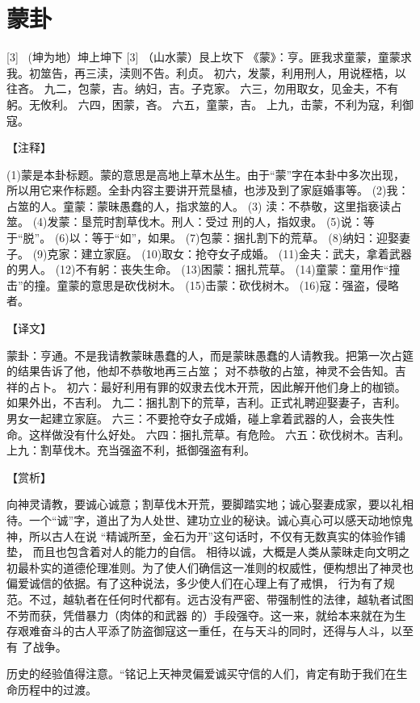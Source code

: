 \documentclass[12pt,UTF8]{ctexbook}
\begin{document}
\chapter{蒙卦}
[3] \ (坤为地）坤上坤下
[3]
（山水蒙）艮上坎下
《蒙》：亨。匪我求童蒙，童蒙求我。初筮告，再三渎，渎则不告。利贞。
初六，发蒙，利用刑人，用说桎梏，以往吝。
九二，包蒙，吉。纳妇，吉。子克家。
六三，勿用取女，见金夫，不有躬。无攸利。
六四，困蒙，吝。
六五，童蒙，吉。
上九，击蒙，不利为寇，利御寇。

【注释】

(1)蒙是本卦标题。蒙的意思是高地上草木丛生。由于“蒙”字在本卦中多次出现，所以用它来作标题。全卦内容主要讲开荒垦植，也涉及到了家庭婚事等。
(2)我：占筮的人。童蒙：蒙昧愚蠢的人，指求筮的人。
(3) 渎：不恭敬，这里指亵读占筮。
(4)发蒙：垦荒时割草伐木。刑人：受过 刑的人，指奴隶。
(5)说：等于“脱”。
(6)以：等于“如”，如果。
(7)包蒙：捆扎割下的荒草。
(8)纳妇：迎娶妻子。
(9)克家：建立家庭。
(10)取女：抢夺女子成婚。
(11)金夫：武夫，拿着武器的男人。
(12)不有躬：丧失生命。
(13)困蒙：捆扎荒草。
(14)童蒙：童用作“撞击”的撞。童蒙的意思是砍伐树木。
(15)击蒙：砍伐树木。
(16)寇：强盗，侵略者。

【译文】

蒙卦：亨通。不是我请教蒙昧愚蠢的人，而是蒙昧愚蠢的人请教我。把第一次占筵的结果告诉了他，他却不恭敬地再三占筮； 对不恭敬的占筮，神灵不会告知。吉祥的占卜。
初六：最好利用有罪的奴隶去伐木开荒，因此解开他们身上的枷锁。如果外出，不吉利。
九二：捆扎割下的荒草，吉利。正式礼聘迎娶妻子，吉利。男女一起建立家庭。
六三：不要抢夺女子成婚，碰上拿着武器的人，会丧失性命。这样做没有什么好处。
六四：捆扎荒草。有危险。
六五：砍伐树木。吉利。
上九：割草伐木。充当强盗不利，抵御强盗有利。

【赏析】

向神灵请教，要诚心诚意；割草伐木开荒，要脚踏实地；诚心娶妻成家，要以礼相待。一个“诚”字，道出了为人处世、建功立业的秘诀。诚心真心可以感天动地惊鬼神，所以古人在说 “精诚所至，金石为开”这句话时，不仅有无数真实的体验作铺垫， 而且也包含着对人的能力的自信。 相待以诚，大概是人类从蒙昧走向文明之初最朴实的道德伦理准则。为了使人们确信这一准则的权威性，便构想出了神灵也 偏爱诚信的依据。有了这种说法，多少使人们在心理上有了戒惧， 行为有了规范。不过，越轨者在任何时代都有。远古没有严密、带强制性的法律，越轨者试图不劳而获，凭借暴力（肉体的和武器 的）手段强夺。这一来，就给本来就在为生存艰难奋斗的古人平添了防盗御寇这一重任，在与天斗的同时，还得与人斗，以至有 了战争。

历史的经验值得注意。“铭记上天神灵偏爱诚买守信的人们，肯定有助于我们在生命历程中的过渡。
\end{document}
